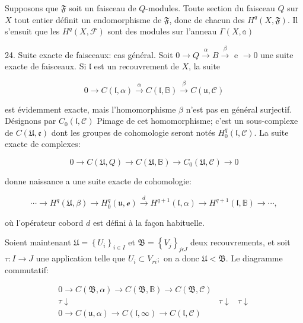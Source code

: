 Supposons que $\mathfrak{F}$ soit un faisceau de $Q$-modules. Toute section du faisceau $Q$ sur $X$ tout entier définit un endomorphisme de $\mathfrak{F}$, donc de chacun des $H^{q}(X, \mathfrak{F})$. Il s'ensuit que les $H^{q}(X, \mathcal{F})$ sont des modules sur l'anneau $\Gamma(X, \mathbb{a})$

24. Suite exacte de faisceaux: cas général. Soit $0 \rightarrow Q \stackrel{\alpha}{\rightarrow} B \stackrel{\beta}{\rightarrow}$ e $\rightarrow 0$ une suite exacte de faisceaux. Si $\mathfrak{l}$ est un recouvrement de $X$, la suite

$$
0 \rightarrow C(\mathfrak{l}, \alpha) \stackrel{\alpha}{\rightarrow} C(\mathfrak{l}, \mathbb{B}) \stackrel{\beta}{\rightarrow} C(\mathfrak{u}, \mathcal{C})
$$

est évidemment exacte, mais l'homomorphisme $\beta$ n'est pas en général surjectif. Désignons par $C_{0}(\mathfrak{l}, \mathcal{C})$ Pimage de cet homomorphisme; c'est un sous-complexe de $C(\mathfrak{U}, \mathfrak{e})$ dont les groupes de cohomologie seront notés $H_{0}^{q}(\mathfrak{l}, \mathcal{C})$. La suite exacte de complexes:

$$
0 \rightarrow C(\mathfrak{U}, Q) \rightarrow C(\mathfrak{U}, \mathbb{B}) \rightarrow C_{0}(\mathfrak{U}, \mathcal{C}) \rightarrow 0
$$

donne naissance a une suite exacte de cohomologie:

$$
\cdots \rightarrow H^{q}(\mathfrak{U}, \beta) \rightarrow H_{0}^{q}(\mathfrak{u}, \mathcal{e}) \stackrel{d}{\rightarrow} H^{q+1}(\mathfrak{l}, \alpha) \rightarrow H^{q+1}(\mathfrak{l}, \mathbb{B}) \rightarrow \cdots,
$$

où l'opérateur cobord $d$ est défini à la façon habituelle.

Soient maintenant $\mathfrak{U}=\left\{U_{i}\right\}_{i \in I}$ et $\mathfrak{B}=\left\{V_{j}\right\}_{j \epsilon J}$ deux recouvrements, et soit $\tau: I \rightarrow J$ une application telle que $U_{i} \subset V_{r i} ;$ on a donc $\mathfrak{U}<\mathfrak{B} .$ Le diagramme commutatif:

$$
\begin{array}{cc}
    0 \rightarrow C(\mathfrak{B}, \alpha) \rightarrow C(\mathfrak{B}, \mathbb{B}) \rightarrow C(\mathfrak{B}, \mathcal{C}) \\
    \tau \downarrow & \tau \downarrow & \tau \downarrow \\
    0 \rightarrow C(\mathfrak{u}, \alpha) \rightarrow C(\mathfrak{l}, \infty) \rightarrow C(\mathfrak{l}, \mathcal{C})
\end{array}
$$

